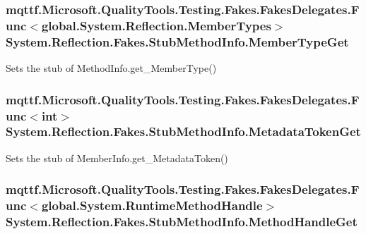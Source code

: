 \hypertarget{class_system_1_1_reflection_1_1_fakes_1_1_stub_method_info_a05b271b962c6d8223217e8a8c8a6bd00}{
\subsubsection[{Member\-Type\-Get}]{\setlength{\rightskip}{0pt plus 5cm}mqttf.\-Microsoft.\-Quality\-Tools.\-Testing.\-Fakes.\-Fakes\-Delegates.\-Func$<$global.\-System.\-Reflection.\-Member\-Types$>$ System.\-Reflection.\-Fakes.\-Stub\-Method\-Info.\-Member\-Type\-Get}}\label{class_system_1_1_reflection_1_1_fakes_1_1_stub_method_info_a05b271b962c6d8223217e8a8c8a6bd00}


Sets the stub of Method\-Info.\-get\-\_\-\-Member\-Type()

\hypertarget{class_system_1_1_reflection_1_1_fakes_1_1_stub_method_info_a1bba80f26bafd0a9a2a2d22a6def0189}{
\subsubsection[{Metadata\-Token\-Get}]{\setlength{\rightskip}{0pt plus 5cm}mqttf.\-Microsoft.\-Quality\-Tools.\-Testing.\-Fakes.\-Fakes\-Delegates.\-Func$<$int$>$ System.\-Reflection.\-Fakes.\-Stub\-Method\-Info.\-Metadata\-Token\-Get}}\label{class_system_1_1_reflection_1_1_fakes_1_1_stub_method_info_a1bba80f26bafd0a9a2a2d22a6def0189}


Sets the stub of Member\-Info.\-get\-\_\-\-Metadata\-Token()

\hypertarget{class_system_1_1_reflection_1_1_fakes_1_1_stub_method_info_ab018ee809b263c953f9d40f20225e1df}{
\subsubsection[{Method\-Handle\-Get}]{\setlength{\rightskip}{0pt plus 5cm}mqttf.\-Microsoft.\-Quality\-Tools.\-Testing.\-Fakes.\-Fakes\-Delegates.\-Func$<$global.\-System.\-Runtime\-Method\-Handle$>$ System.\-Reflection.\-Fakes.\-Stub\-Method\-Info.\-Method\-Handle\-Get}}\label{class_system_1_1_reflection_1_1_fakes_1_1_stub_method_info_ab018ee809b263c953f9d40f20225e1df}


